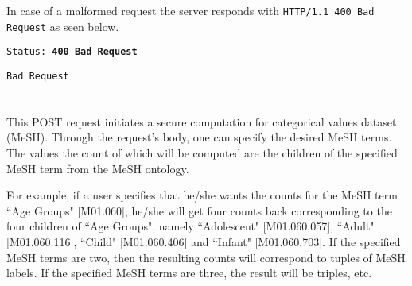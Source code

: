 \begin{description}[labelwidth=5em, leftmargin=\dimexpr\labelwidth+\labelsep\relax]
In case of a malformed request the server responds with \texttt{HTTP/1.1 400 Bad Request} as seen below.\\

\begin{minipage}{\linewidth}
{
\texttt{Status: {\color{BrickRed}\textbf{400 Bad Request}}}
\begin{verbatim}
Bad Request
\end{verbatim}
\label{sc:histogram-numerical-response-2}
}
\end{minipage}

 \end{description}



\section[/smpc/histogram/categorical POST request]{\protect{}}\label{s:post2}
This POST request initiates a secure computation for categorical values dataset (MeSH).
Through the request's body, one can specify the desired MeSH terms.
The values the count of which will be computed are the children of the specified MeSH term from the MeSH ontology.

For example, if a user specifies that he/she wants the counts for the MeSH term ``Age Groups" [M01.060], he/she will get four counts back corresponding to the four children of ``Age Groups", namely ``Adolescent" [M01.060.057], ``Adult" [M01.060.116], ``Child" [M01.060.406] and ``Infant" [M01.060.703].
If the specified MeSH terms are two, then the resulting counts will correspond to tuples of MeSH labels.
If the specified MeSH terms are three, the result will be triples, etc.

